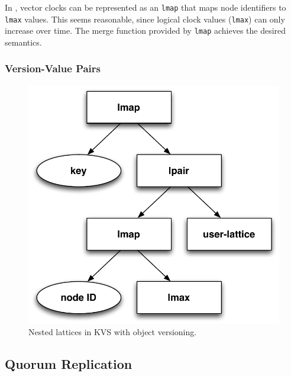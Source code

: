 In \lang, vector clocks can be represented as an \texttt{lmap} that maps node
identifiers to \texttt{lmax} values. This seems reasonable, since logical clock
values (\texttt{lmax}) can only increase over time. The merge function provided
by \texttt{lmap} achieves the desired semantics.

\subsubsection{Version-Value Pairs}
\begin{figure}[t]
\includegraphics[width=\linewidth]{fig/kvs-vc-lattice.pdf}
\caption{Nested lattices in KVS with object versioning.}
\label{fig:kvs-vc-lattices}
\end{figure}


\subsection{Quorum Replication}
